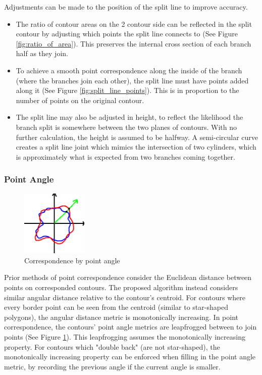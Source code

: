 \documentclass[11p, titlepage]{article}
\begin{document}
Adjustments can be made to the position of the split line to improve accuracy. 
\begin{itemize}
\item The ratio of contour areas on the 2 contour side can be reflected in the split contour by adjusting which points the split line connects to (See Figure \ref{fig:ratio_of_area}). This preserves the internal cross section of each branch half as they join. 
\item To achieve a smooth point correspondence along the inside of the branch (where the branches join each other), the split line must have points added along it (See Figure \ref{fig:split_line_points}). This is in proportion to the number of points on the original contour.
\item The split line may also be adjusted in height, to reflect the likelihood the branch split is somewhere between the two planes of contours. With no further calculation, the height is assumed to be halfway. A semi-circular curve creates a split line joint which mimics the intersection of two cylinders, which is approximately what is expected from two branches coming together.
\end{itemize}

\subsubsection{Point Angle}

\begin{figure}
\centering
\includegraphics[width=0.28\textwidth]{diagrams/point_angle}
\caption{Correspondence by point angle \label{fig:point_angle}}
\end{figure}

Prior methods of point correspondence consider the Euclidean distance between points on corresponded contours. The proposed algorithm instead considers similar angular distance relative to the contour's centroid. For contours where every border point can be seen from the centroid (similar to star-shaped polygons), the angular distance metric is monotonically increasing. In point correspondence, the contours' point angle metrics are leapfrogged between to join points (See Figure \ref{fig:point_angle}). This leapfrogging assumes the monotonically increasing property. For contours which "double back" (are not star-shaped), the monotonically increasing property can be enforced when filling in the point angle metric, by recording the previous angle if the current angle is smaller. 
\end{document}
